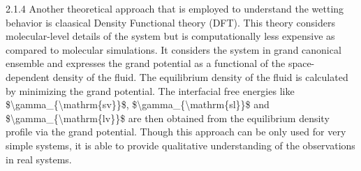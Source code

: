 \par 2.1.4 Another theoretical approach that is employed to understand the wetting behavior is claasical Density Functional theory (DFT). This theory considers molecular-level details of the system but is computationally less expensive as compared to molecular simulations. It considers the system in grand canonical ensemble and expresses the grand potential as a functional of the space-dependent density of the fluid. The equilibrium density of the fluid is calculated by minimizing the grand potential. The interfacial free energies like \$\textbackslash gamma\_\{\textbackslash mathrm\{sv\}\}\$,  \$\textbackslash gamma\_\{\textbackslash mathrm\{sl\}\}\$ and \$\textbackslash gamma\_\{\textbackslash mathrm\{lv\}\}\$ are then obtained from the equilibrium density profile via the grand potential. Though this approach can be only used for very simple systems, it is able to provide qualitative understanding of the observations in real systems.
